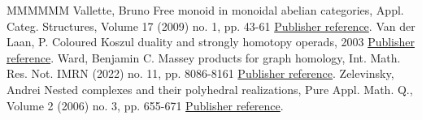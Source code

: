 \documentclass[11pt]{article}
\theoremstyle{definition}
\numberwithin{equation}{section}
\begin{document}
\begin{thebibliography}{MMMMMM}
 Vallette, Bruno Free monoid in monoidal abelian categories, Appl. Categ. Structures, Volume 17 (2009) no. 1, pp. 43-61 \href{https://alco.centre-mersenne.org/articles/10.5802/alco.347/#MR2471247}{Publisher reference}.
 Van der Laan, P. Coloured Koszul duality and strongly homotopy operads, 2003 \href{https://alco.centre-mersenne.org/articles/10.5802/alco.347/#VanDerLaan03}{Publisher reference}.
 Ward, Benjamin C. Massey products for graph homology, Int. Math. Res. Not. IMRN (2022) no. 11, pp. 8086-8161 \href{https://alco.centre-mersenne.org/articles/10.5802/alco.347/#MR4425832}{Publisher reference}.
 Zelevinsky, Andrei Nested complexes and their polyhedral realizations, Pure Appl. Math. Q., Volume 2 (2006) no. 3, pp. 655-671 \href{https://alco.centre-mersenne.org/articles/10.5802/alco.347/#MR2252112}{Publisher reference}.
\end{thebibliography}
\end{document}
